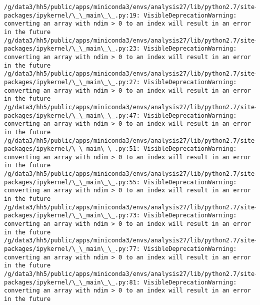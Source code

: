 \documentclass[11pt]{article}
\begin{document}
    \begin{Verbatim}[commandchars=\\\{\}]
/g/data3/hh5/public/apps/miniconda3/envs/analysis27/lib/python2.7/site-packages/ipykernel/\_\_main\_\_.py:19: VisibleDeprecationWarning: converting an array with ndim > 0 to an index will result in an error in the future
/g/data3/hh5/public/apps/miniconda3/envs/analysis27/lib/python2.7/site-packages/ipykernel/\_\_main\_\_.py:23: VisibleDeprecationWarning: converting an array with ndim > 0 to an index will result in an error in the future
/g/data3/hh5/public/apps/miniconda3/envs/analysis27/lib/python2.7/site-packages/ipykernel/\_\_main\_\_.py:27: VisibleDeprecationWarning: converting an array with ndim > 0 to an index will result in an error in the future
/g/data3/hh5/public/apps/miniconda3/envs/analysis27/lib/python2.7/site-packages/ipykernel/\_\_main\_\_.py:47: VisibleDeprecationWarning: converting an array with ndim > 0 to an index will result in an error in the future
/g/data3/hh5/public/apps/miniconda3/envs/analysis27/lib/python2.7/site-packages/ipykernel/\_\_main\_\_.py:51: VisibleDeprecationWarning: converting an array with ndim > 0 to an index will result in an error in the future
/g/data3/hh5/public/apps/miniconda3/envs/analysis27/lib/python2.7/site-packages/ipykernel/\_\_main\_\_.py:55: VisibleDeprecationWarning: converting an array with ndim > 0 to an index will result in an error in the future
/g/data3/hh5/public/apps/miniconda3/envs/analysis27/lib/python2.7/site-packages/ipykernel/\_\_main\_\_.py:73: VisibleDeprecationWarning: converting an array with ndim > 0 to an index will result in an error in the future
/g/data3/hh5/public/apps/miniconda3/envs/analysis27/lib/python2.7/site-packages/ipykernel/\_\_main\_\_.py:77: VisibleDeprecationWarning: converting an array with ndim > 0 to an index will result in an error in the future
/g/data3/hh5/public/apps/miniconda3/envs/analysis27/lib/python2.7/site-packages/ipykernel/\_\_main\_\_.py:81: VisibleDeprecationWarning: converting an array with ndim > 0 to an index will result in an error in the future

    \end{Verbatim}

    \begin{center}
    \end{center}
    { \hspace*{\fill} \\}
    
\end{document}
